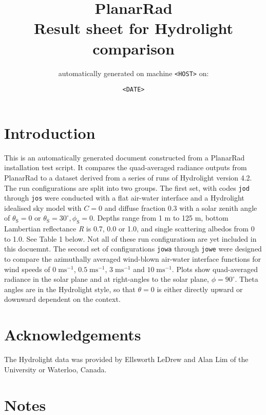 \documentclass[10pt,a4paper]{article}
\begin{document}
\title{PlanarRad\\Result sheet for Hydrolight comparison}
\author{automatically generated on machine \texttt{<HOST>} on:}
\date{\texttt{<DATE>}}

\maketitle



\section*{Introduction}

This is an automatically generated document constructed from a PlanarRad installation test script. It compares the quad-averaged radiance outputs from PlanarRad to a dataset derived from a series of runs of Hydrolight version 4.2. The run configurations are split into two groups. The first set, with codes \texttt{jod} through \texttt{jos} were conducted with a flat air-water interface and a Hydrolight idealised sky model with $C=0$ and diffuse fraction 0.3 with a solar zenith angle of $\theta_\mathrm{S}=0$ or $\theta_\mathrm{S}=30^{\circ},\phi_\mathrm{S}=0$. Depths range from 1 m to 125 m, bottom Lambertian reflectance \textit{R} is 0.7, 0.0 or 1.0, and single scattering albedos from 0 to 1.0. See Table 1 below. Not all of these run configuratiosn are yet included in this docuemnt. The second set of configurations \texttt{jowa} through \texttt{jowe} were designed to compare the azimuthally averaged wind-blown air-water interface functions for wind speeds of $0\;\mathrm{ms}^{-1}$, $0.5\;\mathrm{ms}^{-1}$, $3\;\mathrm{ms}^{-1}$ and $10\;\mathrm{ms}^{-1}$. Plots show quad-averaged radiance in the solar plane and at right-angles to the solar plane, $\phi=90^{\circ}$. Theta angles are in the Hydrolight style, so that $\theta=0$ is either directly upward or downward dependent on the context.

\section*{Acknowledgements}

The Hydrolight data was provided by Ellsworth LeDrew and Alan Lim of the University or Waterloo, Canada.

\section*{Notes}
\end{document}
